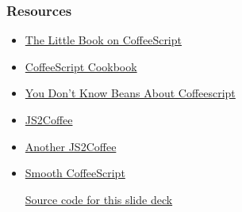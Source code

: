 \documentclass{beamer}
\begin{document}
\begin{frame}
  \frametitle{Resources}
  \begin{itemize}
    \item \href{http://arcturo.github.io/library/coffeescript/}{The
        Little Book on CoffeeScript}
    \item \href{http://www.coffeescriptcookbook.com}{CoffeeScript Cookbook}
    \item \href{http://aseemk.com/talks/intro-to-coffeescript}{You
        Don\rq t Know Beans About Coffeescript}
    \item \href{http://js2coffee.org/}{JS2Coffee}
    \item \href{http://js2coffee.thomaskalka.de}{Another JS2Coffee}
    \item
      \href{http://autotelicum.github.io/Smooth-CoffeeScript/}{Smooth
        CoffeeScript}

    \vspace{2cm}
    \href{https://github.com/tstout/examples/tree/master/coffeescript/slides}{Source
      code for this slide deck}
  \end{itemize}
\end{frame}
\end{document}
